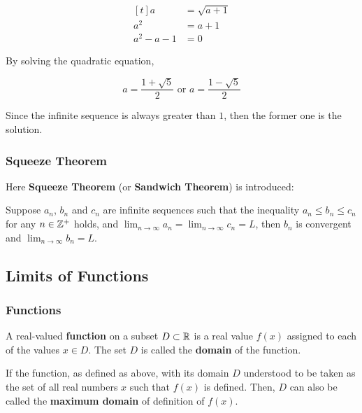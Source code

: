 \documentclass[a4paper,12pt]{article}
\begin{document}
\begin{exm}
\begin{alist}
   $$\begin{aligned}[t]
     a&=\sqrt{a+1}\\
     a^{2}&=a+1\\
     a^{2}-a-1&=0
   \end{aligned}$$\s

   By solving the quadratic equation,

   $$a=\frac{1+\sqrt{5}}{2}\text{ or }a=\frac{1-\sqrt{5}}{2}$$\s

   Since the infinite sequence is always greater than $1$, then the former one is the solution.
   \end{alist}
\end{exm}

\subsubsection{Squeeze Theorem}
Here \textbf{Squeeze Theorem} (or \textbf{Sandwich Theorem}) is introduced:\n

\begin{thm}
  Suppose $a_{n}$, $b_{n}$ and $c_{n}$ are infinite sequences such that the inequality $a_{n}\leq b_{n}\leq c_{n}$ for any $n\in \mathbb{Z}^{+}$ holds, and $\lim_{n\to \infty}a_{n}=\lim_{n\to \infty}c_{n}=L$, then $b_{n}$ is convergent and $\lim_{n\to \infty}b_{n}=L$.
\end{thm}

\subsection{Limits of Functions}
\subsubsection{Functions}
\begin{dft}
  A real-valued \textbf{function} on a subset $D\subset \mathbb{R}$ is a real value $f(x)$ assigned to each of the values $x\in D$. The set $D$ is called the \textbf{domain} of the function.\n

  If the function, as defined as above, with its domain $D$ understood to be taken as the set of all real numbers $x$ such that $f(x)$ is defined. Then, $D$ can also be called the \textbf{maximum domain} of definition of $f(x)$.
\end{dft}
\end{document}
